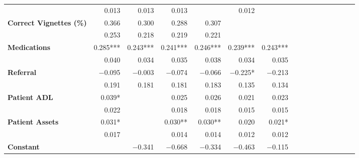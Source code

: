 \begin{tabular}{@{\extracolsep{5pt}}lrrrrrrrrrrrrrrr}
{\bf } & 0.013\phantom{\phantom{)}***} & 0.013\phantom{\phantom{)}***} & 0.013\phantom{\phantom{)}***} & \phantom{***} & 0.012\phantom{\phantom{)}***} & \phantom{***} \\
{\bf Correct Vignettes (\%)} & 0.366\phantom{\phantom{)}***} & 0.300\phantom{\phantom{)}***} & 0.288\phantom{\phantom{)}***} & 0.307\phantom{\phantom{)}***} & \phantom{***} & \phantom{***} \\
{\bf } & 0.253\phantom{\phantom{)}***} & 0.218\phantom{\phantom{)}***} & 0.219\phantom{\phantom{)}***} & 0.221\phantom{\phantom{)}***} & \phantom{***} & \phantom{***} \\
{\bf Medications} & 0.285\phantom{)}*** & 0.243\phantom{)}*** & 0.241\phantom{)}*** & 0.246\phantom{)}*** & 0.239\phantom{)}*** & 0.243\phantom{)}*** \\
{\bf } & 0.040\phantom{\phantom{)}***} & 0.034\phantom{\phantom{)}***} & 0.035\phantom{\phantom{)}***} & 0.038\phantom{\phantom{)}***} & 0.034\phantom{\phantom{)}***} & 0.035\phantom{\phantom{)}***} \\
{\bf Referral} & $-$0.095\phantom{\phantom{)}***} & $-$0.003\phantom{\phantom{)}***} & $-$0.074\phantom{\phantom{)}***} & $-$0.066\phantom{\phantom{)}***} & $-$0.225\phantom{)}*\phantom{**} & $-$0.213\phantom{\phantom{)}***} \\
{\bf } & 0.191\phantom{\phantom{)}***} & 0.181\phantom{\phantom{)}***} & 0.181\phantom{\phantom{)}***} & 0.183\phantom{\phantom{)}***} & 0.135\phantom{\phantom{)}***} & 0.134\phantom{\phantom{)}***} \\
{\bf Patient ADL} & 0.039\phantom{)}*\phantom{**} & \phantom{***} & 0.025\phantom{\phantom{)}***} & 0.026\phantom{\phantom{)}***} & 0.021\phantom{\phantom{)}***} & 0.023\phantom{\phantom{)}***} \\
{\bf } & 0.022\phantom{\phantom{)}***} & \phantom{***} & 0.018\phantom{\phantom{)}***} & 0.018\phantom{\phantom{)}***} & 0.015\phantom{\phantom{)}***} & 0.015\phantom{\phantom{)}***} \\
{\bf Patient Assets} & 0.031\phantom{)}*\phantom{**} & \phantom{***} & 0.030\phantom{)}**\phantom{*} & 0.030\phantom{)}**\phantom{*} & 0.020\phantom{\phantom{)}***} & 0.021\phantom{)}*\phantom{**} \\
{\bf } & 0.017\phantom{\phantom{)}***} & \phantom{***} & 0.014\phantom{\phantom{)}***} & 0.014\phantom{\phantom{)}***} & 0.012\phantom{\phantom{)}***} & 0.012\phantom{\phantom{)}***} \\
{\bf Constant} & \phantom{***} & $-$0.341\phantom{\phantom{)}***} & $-$0.668\phantom{\phantom{)}***} & $-$0.334\phantom{\phantom{)}***} & $-$0.463\phantom{\phantom{)}***} & $-$0.115\phantom{\phantom{)}***} \\

\end{tabular}

